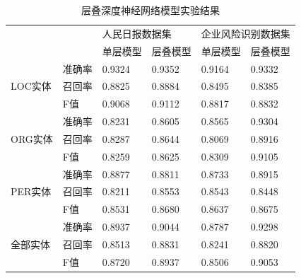 \documentclass[winfonts,master,oneside,nobackinfo]{njuthesis}
\begin{document}
\begin{table}[H]
\centering
\begin{tabular}{|l|l|l|l|l|l|}
\hline
\multicolumn{2}{|l|}{\multirow{2}{*}{}} & \multicolumn{2}{l|}{人民日报数据集} & \multicolumn{2}{l|}{企业风险识别数据集} \\ \cline{3-6} 
\multicolumn{2}{|l|}{}                  & 单层模型          & 层叠模型         & 单层模型           & 层叠模型          \\ \hline
\multirow{3}{*}{LOC实体}       & 准确率      & 0.9324        & 0.9352       & 0.9164         & 0.9332        \\ \cline{2-6} 
                             & 召回率      & 0.8825        & 0.8884       & 0.8495         & 0.8385        \\ \cline{2-6} 
                             & F值       & 0.9068        & 0.9112       & 0.8817         & 0.8832        \\ \hline
\multirow{3}{*}{ORG实体}       & 准确率      & 0.8231        & 0.8605       & 0.8565         & 0.9304        \\ \cline{2-6} 
                             & 召回率      & 0.8287        & 0.8644       & 0.8069         & 0.8916        \\ \cline{2-6} 
                             & F值       & 0.8259        & 0.8625       & 0.8309         & 0.9105        \\ \hline
\multirow{3}{*}{PER实体}       & 准确率      & 0.8877        & 0.8811       & 0.8733         & 0.8915        \\ \cline{2-6} 
                             & 召回率      & 0.8211        & 0.8553       & 0.8543         & 0.8448        \\ \cline{2-6} 
                             & F值       & 0.8531        & 0.8680       & 0.8637         & 0.8675        \\ \hline
\multirow{3}{*}{全部实体}        & 准确率      & 0.8937        & 0.9044       & 0.8787         & 0.9298        \\ \cline{2-6} 
                             & 召回率      & 0.8513        & 0.8831       & 0.8241         & 0.8820        \\ \cline{2-6} 
                             & F值       & 0.8720        & 0.8937       & 0.8506         & 0.9053        \\ \hline
\hline
\end{tabular}
\caption{层叠深度神经网络模型实验结果}
\end{table}
\end{document}
